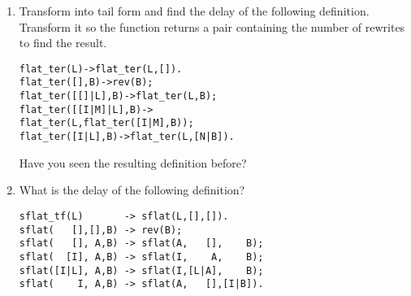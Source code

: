 \begin{enumerate}
  \item Transform into tail form and find the delay of the following
    definition. Transform it so the function returns a pair containing
    the number of rewrites to find the result.
\begin{alltt}
flat_ter(L)           -> flat_ter(L,[]).
flat_ter(       [],B) -> rev(B);
flat_ter(   [[]|L],B) -> flat_ter(L,B);
flat_ter([[I|M]|L],B) ->
\hfill flat_ter(L,flat_ter([I|M],B));
flat_ter(    [I|L],B) -> flat_ter(L,[N|B]).
\end{alltt}
Have you seen the resulting definition before?

  \item What is the delay of the following definition?
\begin{verbatim}
sflat_tf(L)       -> sflat(L,[],[]).
sflat(   [],[],B) -> rev(B);
sflat(   [], A,B) -> sflat(A,   [],    B);
sflat(  [I], A,B) -> sflat(I,    A,    B);
sflat([I|L], A,B) -> sflat(I,[L|A],    B);
sflat(    I, A,B) -> sflat(A,   [],[I|B]).
\end{verbatim}

\end{enumerate}
